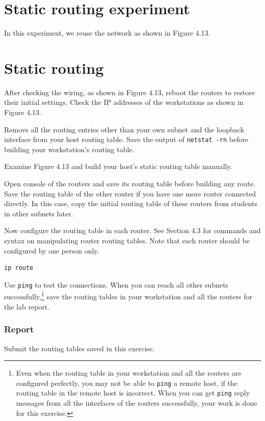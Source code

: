 \documentclass{../UTNetLab}
\begin{document}
\section*{Static routing experiment}
    In this experiment, we reuse the network as shown in Figure 4.13.
\section{Static routing}
    After checking the wiring, as shown in Figure 4.13, reboot the routers to restore their initial settings.
    Check the IP addresses of the workstations as shown in Figure 4.13. 

    Remove all the routing entries other than your own subnet and the loopback interface from your host routing table.
    Save the output of \lstinline{netstat -rn} before building your workstation’s routing table. 

    Examine Figure 4.13 and build your host’s static routing table manually. 

    Open console of the routers and save its routing table before building any route.
    Save the routing table of the other router if you have one more router connected directly.
    In this case, copy the initial routing table of these routers from students in other subnets later. 

    Now configure the routing table in each router.
    See Section 4.3 for commands and syntax on manipulating router routing tables.
    Note that each router should be configured by one person only. 

    \begin{lstlisting}
ip route
    \end{lstlisting}

    Use \lstinline{ping} to test the connections.
    When you can reach all other subnets successfully,\footnote{Even when the routing table in your workstation and all the routers are configured perfectly, you may not be able to \lstinline{ping} a remote host, if the routing table in the remote host is incorrect.
    When you can get \lstinline{ping} reply messages from all the interfaces of the routers successfully, your work is done for this exercise.} save the routing tables in your workstation and all the routers for the lab report.
    
    \subsubsection*{Report}
    Submit the routing tables saved in this exercise.
\end{document}
